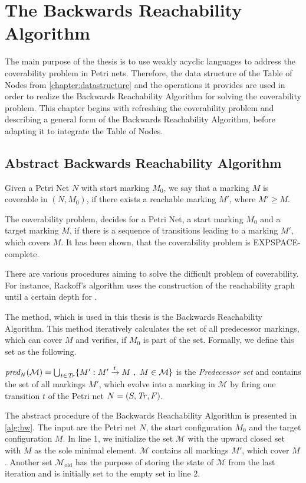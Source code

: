 \chapter{The Backwards Reachability Algorithm}\label{chapter:coverability}

The main purpose of the thesis is to use weakly acyclic languages to address the coverability problem in Petri nets. Therefore, the data structure of the Table of Nodes from \autoref{chapter:datastructure} and the operations it provides are used in order to realize the Backwards Reachability Algorithm for solving the coverability problem. This chapter begins with refreshing the coverability problem and describing a general form of the Backwards Reachability Algorithm, before adapting it to integrate the  Table of Nodes.

\section{Abstract Backwards Reachability Algorithm}\label{sec:abstractbw} 
Given a Petri Net $N$ with start marking $M_{0}$, we say that a marking $M$ is coverable in $(N,M_{0})$, if there exists a reachable marking $M'$, where $M'\ge M$. 

The coverability problem, decides for a Petri Net, a start marking $M_{0}$ and a target marking $M$, if there is a sequence of transitions leading to a marking $M'$, which covers $M$. It has been shown, that the coverability problem is EXPSPACE-complete. 

\par
There are various procedures aiming to solve the difficult problem of coverability. For instance, Rackoff's algorithm uses the construction of the reachability graph until a certain depth for . 
\par
The method, which is used in this thesis is the Backwards Reachability Algorithm. This method iteratively calculates the set of all predecessor markings, which can cover $M$ and verifies, if $M_{0}$ is part of the set. Formally, we define this set as the following.
\begin{definition}\label{def:ppre}
$\operatorname{\textit{pred}}_{N}(\mathcal{M}) = \bigcup_{t \in \mathit{Tr}} \{M': M' \xrightarrow{t} M \ , \ M \in \mathcal{M} \}$ is the \emph{Predecessor set} and contains the set of all markings $M'$, which evolve into a marking in $\mathcal{M}$ by firing one transition $t$ of the Petri net $N = (S,\mathit{Tr},F)$.
\end{definition}
\par 
The abstract procedure of the Backwards Reachability Algorithm is presented in \autoref{alg:bw}. The input are the Petri net $N$, the start configuration $M_{0}$ and the target configuration $M$. In line 1, we initialize the set $\mathcal{M}$ with the upward closed set with $M$ as the sole minimal element. $\mathcal{M}$ contains all markings $M'$, which cover $M$. Another set $\mathcal{M}_{\text{old}}$ has the purpose of storing the state of $\mathcal{M}$ from the last iteration and is initially set to the empty set in line 2.

